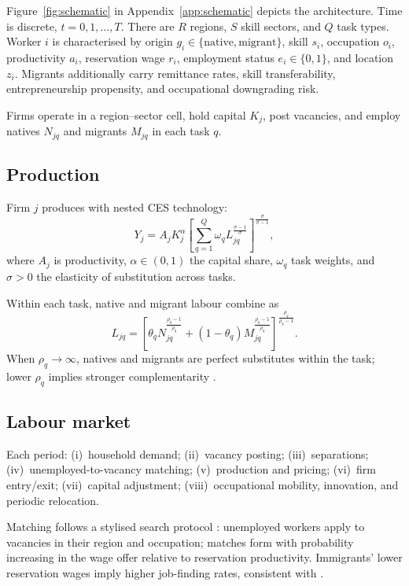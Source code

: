 \documentclass[11pt,a4paper]{article}
\begin{document}
Figure~\ref{fig:schematic} in Appendix~\ref{app:schematic} depicts the architecture.
Time is discrete, $t = 0,1,\ldots,T$.
There are $R$ regions, $S$ skill sectors, and $Q$ task types.
Worker $i$ is characterised by origin $g_i \in \{\text{native},\text{migrant}\}$, skill $s_i$, occupation $o_i$, productivity $a_i$, reservation wage $r_i$, employment status $e_i \in \{0,1\}$, and location $z_i$.
Migrants additionally carry remittance rates, skill transferability, entrepreneurship propensity, and occupational downgrading risk.

Firms operate in a region--sector cell, hold capital $K_j$, post vacancies, and employ natives $N_{jq}$ and migrants $M_{jq}$ in each task $q$.

\subsection{Production}

Firm $j$ produces with nested CES technology:
\begin{equation}
  \label{eq:production}
  Y_j = A_j K_j^{\alpha}
  \left[
    \sum_{q=1}^{Q} \omega_q L_{jq}^{\frac{\sigma-1}{\sigma}}
  \right]^{\frac{\sigma}{\sigma-1}},
\end{equation}
where $A_j$ is productivity, $\alpha \in (0,1)$ the capital share, $\omega_q$ task weights, and $\sigma>0$ the elasticity of substitution across tasks.

Within each task, native and migrant labour combine as
\begin{equation}
  \label{eq:task}
  L_{jq} =
  \left[
    \theta_q N_{jq}^{\frac{\rho_q-1}{\rho_q}}
    + (1-\theta_q) M_{jq}^{\frac{\rho_q-1}{\rho_q}}
  \right]^{\frac{\rho_q}{\rho_q-1}}.
\end{equation}
When $\rho_q \to \infty$, natives and migrants are perfect substitutes within the task; lower $\rho_q$ implies stronger complementarity \citep{peri2009,peri2016}.

\subsection{Labour market}

Each period: (i)~household demand; (ii)~vacancy posting; (iii)~separations; (iv)~unemployed-to-vacancy matching; (v)~production and pricing; (vi)~firm entry/exit; (vii)~capital adjustment; (viii)~occupational mobility, innovation, and periodic relocation.

Matching follows a stylised search protocol \citep{pissarides2000}: unemployed workers apply to vacancies in their region and occupation; matches form with probability increasing in the wage offer relative to reservation productivity.
Immigrants' lower reservation wages imply higher job-finding rates, consistent with \citet{albert2021}.
\end{document}
